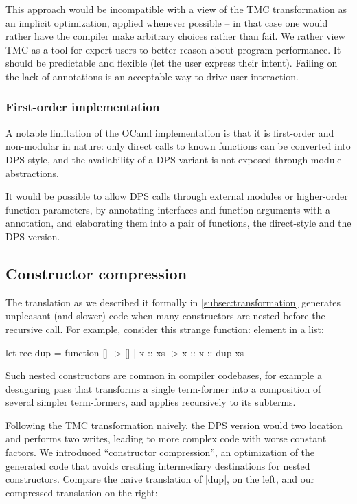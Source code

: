 This approach would be incompatible with a view of the TMC
transformation as an implicit optimization, applied whenever
possible -- in that case one would rather have the compiler make
arbitrary choices rather than fail. We rather view TMC as a tool for
expert users to better reason about program performance. It should be
predictable and flexible (let the user express
their intent). Failing on the lack of annotations is an acceptable way
to drive user interaction.

\subsubsection{First-order implementation} A notable limitation of the
OCaml implementation is that it is first-order and non-modular in
nature: only direct calls to known functions can be converted into DPS
style, and the availability of a DPS variant is not exposed through
module abstractions.

It would be possible to allow DPS calls through external modules or
higher-order function parameters, by annotating interfaces and
function arguments with a  annotation, and
elaborating them into a pair of functions, the direct-style and the DPS
version.

\subsection{Constructor compression} \label{subsec:constructor-compression} The translation as we described it formally in \cref{subsec:transformation} generates unpleasant (and slower) code when many constructors are nested before the recursive call. For example, consider this strange function: element in a list:
\begin{Ocaml}
let rec dup = function [] -> [] | x :: xs -> x :: x :: dup xs
\end{Ocaml}

Such nested constructors are common in compiler codebases, for
example a desugaring pass that transforms a single term-former into
a composition of several simpler term-formers, and applies recursively to
its subterms.

Following the TMC transformation naively, the DPS version would two location and performs two writes, leading to more complex code with worse constant factors. We introduced ``constructor compression'', an optimization of the generated code that avoids creating intermediary destinations for nested constructors. Compare the naive translation of \ocaml|dup|, on the left, and our compressed translation on the right:

